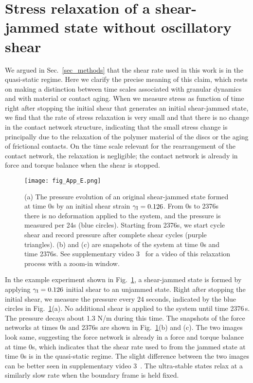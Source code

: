 \documentclass[twocolumn,showkeys,superscriptaddress,preprintnumbers,amsmath,amssymb,showpacs,prx,longbibliography]{revtex4-2}
\begin{document}
\section{Stress relaxation of a shear-jammed state without oscillatory shear}\label{app_creep}

We argued in Sec.~\ref{sec_methods} that the shear rate used in this work is in the quasi-static regime. Here we clarify the precise meaning of this claim, which rests on making a distinction between time scales associated with granular dynamics and with material or contact aging.  When we measure stress as function of time right after stopping the initial shear that generates an initial shear-jammed state, we find that the rate of stress relaxation is very small and that there is no change in the contact network structure, indicating that the small stress change is principally due to the relaxation of the polymer material of the discs or the aging of frictional contacts.  On the time scale relevant for the rearrangement of the contact network, the relaxation is negligible; the contact network is already in force and torque balance when the shear is stopped. 


\begin{figure}[!t]
    \centering
    \texttt{[image: fig\_App\_E.png]}
    \caption{(a) The pressure evolution of an original shear-jammed state formed at time 0s by an initial shear strain $\gamma_{\rm I}=0.126$. From 0s to 2376s there is no deformation applied to the system, and the pressure is measured per 24s (blue circles). Starting from 2376s, we start cycle shear and record pressure after complete shear cycles (purple triangles). (b) and (c) are snapshots of the system at time 0s and time 2376s. See supplementary video 3~\cite{Note1} for a video of this relaxation process with a zoom-in window.}
    \label{fig:app_creep}
\end{figure}


In the example experiment shown in Fig.~\ref{fig:app_creep}, a shear-jammed state is formed by applying $\gamma_{\rm I} = 0.126$ initial shear to an unjammed state. Right after stopping the initial shear, we measure the pressure every 24 seconds, indicated by the blue circles in Fig.~\ref{fig:app_creep}(a). No additional shear is applied to the system until time 2376$\,$s. 
The pressure decays about 1.3 N/m during this time.
The snapshots of the force networks at times 0s and 2376s are shown in Fig.~\ref{fig:app_creep}(b) and (c). The two images look same, suggesting the force network is already in a force and torque balance at time 0s, which  indicates that the shear rate used to from the jammed state at time 0s is in the quasi-static regime. The slight difference between the two images can be better seen in supplementary video 3~\cite{Note1}. The ultra-stable states relax at a similarly slow rate when the boundary frame is held fixed.
\end{document}
